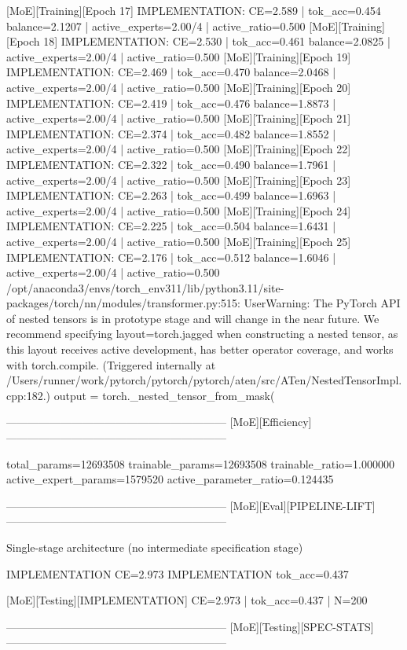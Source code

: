 [MoE][Training][Epoch 17] IMPLEMENTATION: CE=2.589 | tok_acc=0.454
balance=2.1207 | active_experts=2.00/4 | active_ratio=0.500
[MoE][Training][Epoch 18] IMPLEMENTATION: CE=2.530 | tok_acc=0.461
balance=2.0825 | active_experts=2.00/4 | active_ratio=0.500
[MoE][Training][Epoch 19] IMPLEMENTATION: CE=2.469 | tok_acc=0.470
balance=2.0468 | active_experts=2.00/4 | active_ratio=0.500
[MoE][Training][Epoch 20] IMPLEMENTATION: CE=2.419 | tok_acc=0.476
balance=1.8873 | active_experts=2.00/4 | active_ratio=0.500
[MoE][Training][Epoch 21] IMPLEMENTATION: CE=2.374 | tok_acc=0.482
balance=1.8552 | active_experts=2.00/4 | active_ratio=0.500
[MoE][Training][Epoch 22] IMPLEMENTATION: CE=2.322 | tok_acc=0.490
balance=1.7961 | active_experts=2.00/4 | active_ratio=0.500
[MoE][Training][Epoch 23] IMPLEMENTATION: CE=2.263 | tok_acc=0.499
balance=1.6963 | active_experts=2.00/4 | active_ratio=0.500
[MoE][Training][Epoch 24] IMPLEMENTATION: CE=2.225 | tok_acc=0.504
balance=1.6431 | active_experts=2.00/4 | active_ratio=0.500
[MoE][Training][Epoch 25] IMPLEMENTATION: CE=2.176 | tok_acc=0.512
balance=1.6046 | active_experts=2.00/4 | active_ratio=0.500
/opt/anaconda3/envs/torch_env311/lib/python3.11/site-packages/torch/nn/modules/transformer.py:515: UserWarning: The PyTorch API of nested tensors is in prototype stage and will change in the near future. We recommend specifying layout=torch.jagged when constructing a nested tensor, as this layout receives active development, has better operator coverage, and works with torch.compile. (Triggered internally at /Users/runner/work/pytorch/pytorch/pytorch/aten/src/ATen/NestedTensorImpl.cpp:182.)
output = torch._nested_tensor_from_mask(

------------------------------------------------------------
[MoE][Efficiency]
------------------------------------------------------------

total_params=12693508
trainable_params=12693508
trainable_ratio=1.000000
active_expert_params=1579520
active_parameter_ratio=0.124435

------------------------------------------------------------
[MoE][Eval][PIPELINE-LIFT]
------------------------------------------------------------

Single-stage architecture (no intermediate specification stage)

IMPLEMENTATION CE=2.973
IMPLEMENTATION tok_acc=0.437

[MoE][Testing][IMPLEMENTATION] CE=2.973 | tok_acc=0.437 | N=200

------------------------------------------------------------
[MoE][Testing][SPEC-STATS]
------------------------------------------------------------

